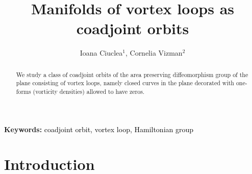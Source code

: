 \documentclass[11pt]{article}
\begin{document}
\newtheorem{theorem}{Theorem}[section]
\newtheorem{definition}[theorem]{Definition}
\newtheorem{lemma}[theorem]{Lemma}
\newtheorem{remark}[theorem]{Remark}
\newtheorem{proposition}[theorem]{Proposition}
\newtheorem{corollary}[theorem]{Corollary}
\newtheorem{example}[theorem]{Example}



\title{Manifolds of vortex loops as coadjoint orbits}
\author{Ioana Ciuclea$^1$, Cornelia Vizman$^2$}
\addtocounter{footnote}{1}




\date{ }
\maketitle
\makeatother





\begin{abstract}
We study a class of coadjoint orbits of the area preserving diffeomorphism group of
the plane consisting of vortex loops, namely closed curves in the plane decorated with
one-forms (vorticity densities) allowed to have zeros.
\end{abstract}

\noindent \textbf{Keywords:} \textcolor{black}{coadjoint orbit, vortex loop, Hamiltonian group}


\section{Introduction}
\end{document}
